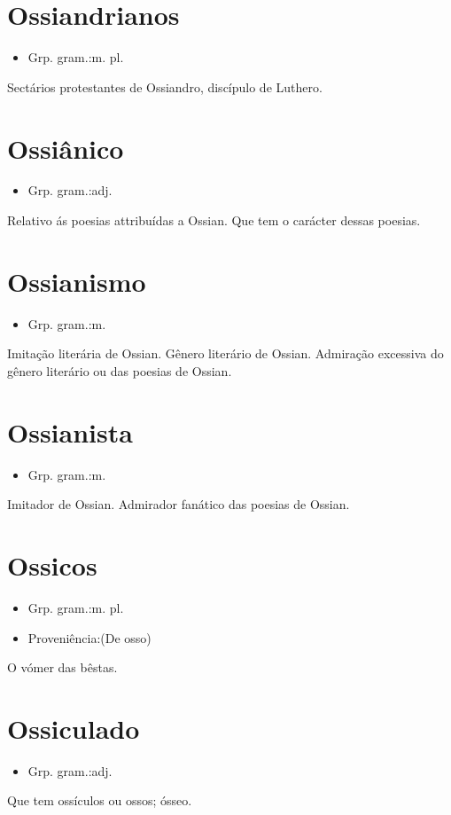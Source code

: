 \section{Ossiandrianos}
\begin{itemize}
\item {Grp. gram.:m. pl.}
\end{itemize}
Sectários protestantes de Ossiandro, discípulo de Luthero.
\section{Ossiânico}
\begin{itemize}
\item {Grp. gram.:adj.}
\end{itemize}
Relativo ás poesias attribuídas a Ossian.
Que tem o carácter dessas poesias.
\section{Ossianismo}
\begin{itemize}
\item {Grp. gram.:m.}
\end{itemize}
Imitação literária de Ossian.
Gênero literário de Ossian.
Admiração excessiva do gênero literário ou das poesias de Ossian.
\section{Ossianista}
\begin{itemize}
\item {Grp. gram.:m.}
\end{itemize}
Imitador de Ossian.
Admirador fanático das poesias de Ossian.
\section{Ossicos}
\begin{itemize}
\item {Grp. gram.:m. pl.}
\end{itemize}
\begin{itemize}
\item {Proveniência:(De \textunderscore osso\textunderscore )}
\end{itemize}
O vómer das bêstas.
\section{Ossiculado}
\begin{itemize}
\item {Grp. gram.:adj.}
\end{itemize}
Que tem ossículos ou ossos; ósseo.
